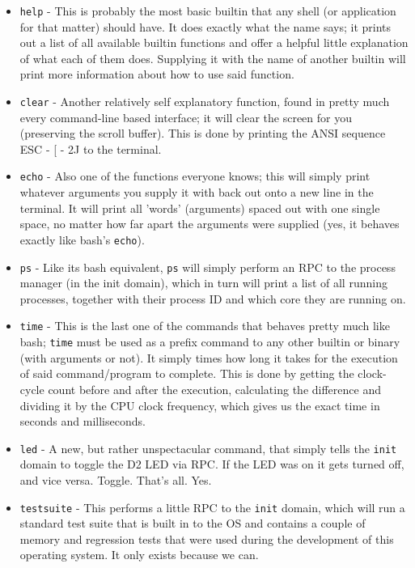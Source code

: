 \begin{itemize}
	\item \texttt{help} - This is probably the most basic builtin that any 
	shell (or application for that matter) should have. It does exactly what 
	the name says; it prints out a list of all available builtin functions and 
	offer a helpful little explanation of what each of them does. Supplying it 
	with the name of another builtin will print more information about how to 
	use said function.
	
	\item \texttt{clear} - Another relatively self explanatory function, found 
	in pretty much every command-line based interface; it will clear the screen 
	for you (preserving the scroll buffer). This is done by printing the ANSI 
	sequence ESC - {[} - 2J to the terminal.
	
	\item \texttt{echo} - Also one of the functions everyone knows; this will 
	simply print whatever arguments you supply it with back out onto a new line 
	in the terminal. It will print all 'words' (arguments) spaced out with one 
	single space, no matter how far apart the arguments were supplied (yes, it 
	behaves exactly like bash's \texttt{echo}).
	
	\item \texttt{ps} - Like its bash equivalent, \texttt{ps} will simply 
	perform an RPC to the process manager (in the init domain), which in turn 
	will print a list of all running processes, together with their process ID 
	and which core they are running on.
	
	\item \texttt{time} - This is the last one of the commands that behaves 
	pretty much like bash; \texttt{time} must be used as a prefix command to 
	any other builtin or binary (with arguments or not). It simply times how 
	long it takes for the execution of said command/program to complete. This 
	is done by getting the clock-cycle count before and after the execution, 
	calculating the difference and dividing it by the CPU clock frequency, 
	which gives us the exact time in seconds and milliseconds.
	
	\item \texttt{led} - A new, but rather unspectacular command, that simply 
	tells the \texttt{init} domain to toggle the D2 LED via RPC. If the LED was 
	on it gets turned off, and vice versa. Toggle. That's all. Yes.
	
	\item \texttt{testsuite} - This performs a little RPC to the \texttt{init} 
	domain, which will run a standard test suite that is built in to the OS and 
	contains a couple of memory and regression tests that were used during the 
	development of this operating system. It only exists because we can.
	

\end{itemize}
